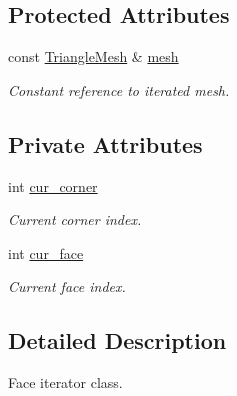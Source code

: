 \subsection*{Protected Attributes}
\begin{DoxyCompactItemize}
\item 
\mbox{\label{classgeoproc_1_1iterators_1_1mesh__iterator_a6102e0c43bcf7008597387a2f085ca0e}} 
const \hyperlink{classgeoproc_1_1TriangleMesh}{Triangle\+Mesh} \& \hyperlink{classgeoproc_1_1iterators_1_1mesh__iterator_a6102e0c43bcf7008597387a2f085ca0e}{mesh}
\begin{DoxyCompactList}\small\item\em Constant reference to iterated mesh. \end{DoxyCompactList}\end{DoxyCompactItemize}
\subsection*{Private Attributes}
\begin{DoxyCompactItemize}
\item 
\mbox{\label{classgeoproc_1_1iterators_1_1vertex_1_1vertex__face__iterator_a3e59b193d3d83c32a803528a0661672b}} 
int \hyperlink{classgeoproc_1_1iterators_1_1vertex_1_1vertex__face__iterator_a3e59b193d3d83c32a803528a0661672b}{cur\+\_\+corner}
\begin{DoxyCompactList}\small\item\em Current corner index. \end{DoxyCompactList}\item 
\mbox{\label{classgeoproc_1_1iterators_1_1vertex_1_1vertex__face__iterator_ac7cecb32cc46b910764b56b977ca8366}} 
int \hyperlink{classgeoproc_1_1iterators_1_1vertex_1_1vertex__face__iterator_ac7cecb32cc46b910764b56b977ca8366}{cur\+\_\+face}
\begin{DoxyCompactList}\small\item\em Current face index. \end{DoxyCompactList}\end{DoxyCompactItemize}


\subsection{Detailed Description}
Face iterator class. 

